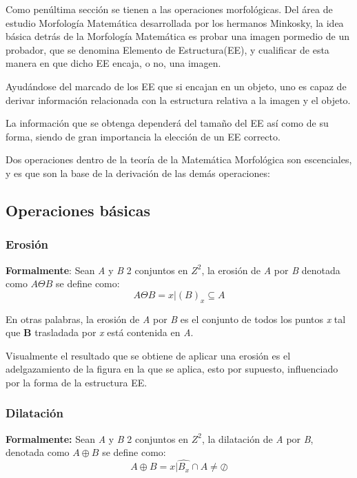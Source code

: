 \hfill\break
\justifying
Como penúltima sección se tienen a las operaciones morfológicas. Del área de estudio Morfología Matemática desarrollada por los hermanos Minkosky, la idea básica detrás de la Morfología Matemática es probar una imagen pormedio de un probador, que se denomina Elemento de Estructura(EE), y cualificar de esta manera en que dicho EE encaja, o no, una imagen.

\hfill\break
\justifying
Ayudándose del marcado de los EE que si encajan en un objeto, uno es capaz de derivar información relacionada con la estructura relativa a la imagen y el objeto.

\hfill\break
\justifying
La información que se obtenga dependerá del tamaño del EE así como de su forma, siendo de gran importancia la elección de un EE correcto.

\hfill\break
\justifying
Dos operaciones dentro de la teoría de la Matemática Morfológica son escenciales, y es que son la base de la derivación de las demás operaciones:

\subsection*{Operaciones básicas}
	\subsubsection*{Erosión}
		\hfill\break
		\justifying
		\textbf{Formalmente}: Sean \textit{A} y \textit{B} 2 conjuntos en $Z^2$, la erosión de \textit{A} por \textit{B} denotada como $A\Theta B$ se define como:
		\begin{equation*}
			A\Theta B = {x|(B)_x\subseteq A}
		\end{equation*}
	
		\hfill\break
		\justifying
		En otras palabras, la erosión de \textit{A} por \textit{B} es el conjunto de todos los puntos \textit{x} tal que \textbf{B} trasladada por \textit{x} está contenida en \textit{A}.
		
		\hfill\break
		\justifying
		Visualmente el resultado que se obtiene de aplicar una erosión es el adelgazamiento de la figura en la que se aplica, esto por supuesto, influenciado por la forma de la estructura EE.
		
	\subsubsection*{Dilatación}
		\hfill\break
		\justifying
		\textbf{Formalmente:} Sean \textit{A} y \textit{B} 2 conjuntos en $Z^2$, la dilatación de \textit{A} por \textit{B}, denotada como $A\oplus B$ se define como:
		\begin{equation*}
			A\oplus B = {x|\hat{B_x} \cap A \neq \oslash}
		\end{equation*}
	
